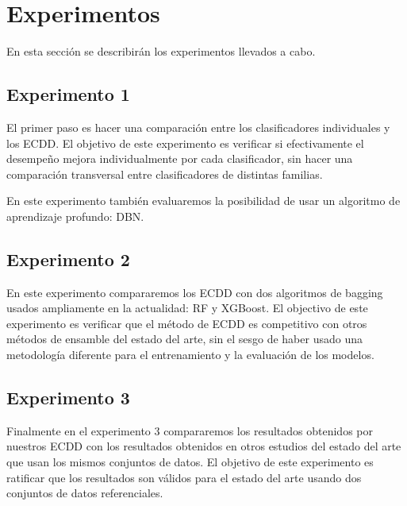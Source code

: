 \section{Experimentos}

En esta sección se describirán los experimentos llevados a cabo.

\subsection{Experimento 1}

El primer paso es hacer una comparación entre los clasificadores individuales y los \ac{ECDD}. El objetivo de este experimento es verificar si efectivamente el desempeño mejora individualmente por cada clasificador, sin hacer una comparación transversal entre clasificadores de distintas familias.

En este experimento también evaluaremos la posibilidad de usar un algoritmo de aprendizaje profundo: \ac{DBN}.

\subsection{Experimento 2}

En este experimento compararemos los \ac{ECDD} con dos algoritmos de bagging usados ampliamente en la actualidad: \ac{RF} y \ac{XGBoost}. El objectivo de este experimento es verificar que el método de \ac{ECDD} es competitivo con otros métodos de ensamble del estado del arte, sin el sesgo de haber usado una metodología diferente para el entrenamiento y la evaluación de los modelos.

\subsection{Experimento 3}

Finalmente en el experimento 3 compararemos los resultados obtenidos por nuestros \ac{ECDD} con los resultados obtenidos en otros estudios del estado del arte que usan los mismos conjuntos de datos. El objetivo de este experimento es ratificar que los resultados son válidos para el estado del arte usando dos conjuntos de datos referenciales.
